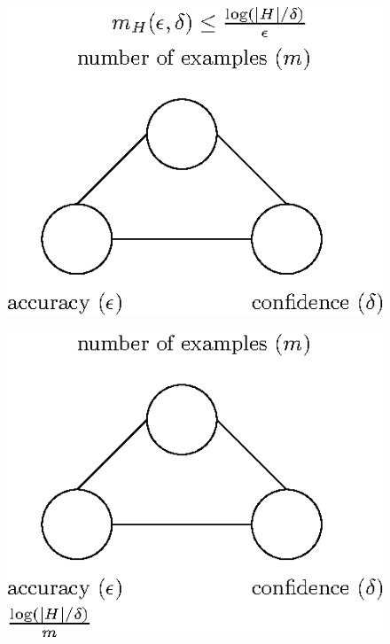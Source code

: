 \documentclass[11pt]{article}
\begin{document}
  \begin{figure}[h!]
 \centering\includegraphics[scale=0.8]{connection_m_eps_delta_finite4.eps}
  \end{figure}


  \begin{figure}[h!]
 \centering\includegraphics[scale=0.8]{connection_m_eps_delta_finite2.eps}
 \end{figure}
\end{document}
